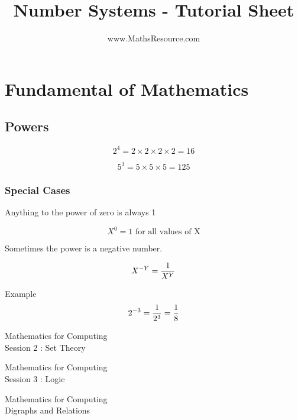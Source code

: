




\title{Number Systems - Tutorial Sheet}
\author{www.MathsResource.com}


\maketitle
\Large

\section{Fundamental of Mathematics}

\subsection{Powers}

\[  2^ 4 = 2 \times 2 \times 2 \times 2 = 16 \]

\[  5^ 3 = 5 \times 5 \times 5 =125 \]

\subsubsection{Special Cases}

Anything to the power of zero is always 1

\[  X^ 0 = 1 \mbox{ for all values of X} \]

Sometimes the power is a negative number.

\[  X^{-Y} = { 1 \over X^Y}  \]

Example 
\[  2^{-3} = { 1 \over 2^3} = { 1 \over 8}  \]


\newpage
\begin{center}
	\huge{Mathematics for Computing}\\
	{\LARGE Session 2 : Set Theory}
\end{center}


\newpage
\newpage
\begin{center}
	\huge{Mathematics for Computing}\\
	{\LARGE Session 3 : Logic}
\end{center}

\newpage
\begin{center}
	\huge{Mathematics for Computing}\\
	\LARGE{Digraphs and Relations}
\end{center}


